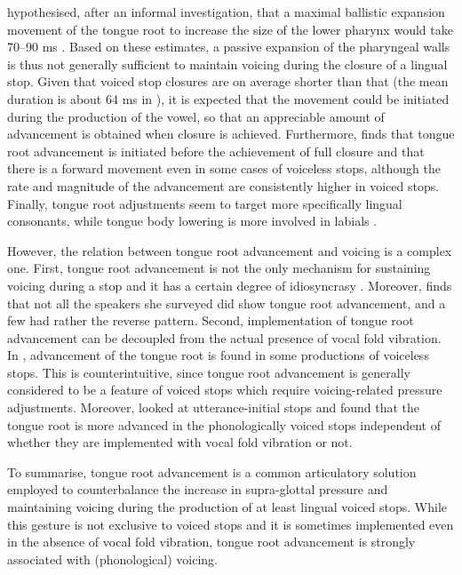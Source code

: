 \documentclass[preprint]{JASAnew}
\begin{document}
\citet{rothenberg1967} hypothesised, after an informal investigation,
that a maximal ballistic expansion movement of the tongue root to
increase the size of the lower pharynx would take 70--90 ms
\citep[99]{rothenberg1967}. Based on these estimates, a passive
expansion of the pharyngeal walls is thus not generally sufficient to
maintain voicing during the closure of a lingual stop. Given that voiced
stop closures are on average shorter than that (the mean duration is
about 64 ms in \citealt{luce1985}), it is expected that the movement
could be initiated during the production of the vowel, so that an
appreciable amount of advancement is obtained when closure is achieved.
Furthermore, \citet{westbury1983} finds that tongue root advancement is
initiated before the achievement of full closure and that there is a
forward movement even in some cases of voiceless stops, although the
rate and magnitude of the advancement are consistently higher in voiced
stops. Finally, tongue root adjustments seem to target more specifically
lingual consonants, while tongue body lowering is more involved in
labials \citep{perkell1969, westbury1983, vazquez-alvarez2007}.

However, the relation between tongue root advancement and voicing is a
complex one. First, tongue root advancement is not the only mechanism
for sustaining voicing during a stop
\citep{rothenberg1967, westbury1983, ohala2011} and it has a certain
degree of idiosyncrasy \citep{ahn2018}. Moreover, \citet{ahn2018} finds
that not all the speakers she surveyed did show tongue root advancement,
and a few had rather the reverse pattern. Second, implementation of
tongue root advancement can be decoupled from the actual presence of
vocal fold vibration. In \citet{westbury1983}, advancement of the tongue
root is found in some productions of voiceless stops. This is
counterintuitive, since tongue root advancement is generally considered
to be a feature of voiced stops which require voicing-related pressure
adjustments. Moreover, \citet{ahn2015, ahn2018} looked at
utterance-initial stops and found that the tongue root is more advanced
in the phonologically voiced stops independent of whether they are
implemented with vocal fold vibration or not.

To summarise, tongue root advancement is a common articulatory solution
employed to counterbalance the increase in supra-glottal pressure and
maintaining voicing during the production of at least lingual voiced
stops. While this gesture is not exclusive to voiced stops and it is
sometimes implemented even in the absence of vocal fold vibration,
tongue root advancement is strongly associated with (phonological)
voicing.
\end{document}
